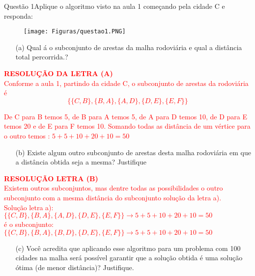\documentclass[12pt]{article}
\begin{document}
\begin{section}{Questão 1}{Aplique o algoritmo visto na aula 1 começando pela cidade C e responda:}

\begin{figure}[H]
    \centering
    \texttt{[image: Figuras/questao1.PNG]}
\end{figure}

\begin{itemize}
    \item[(a)] Qual á o subconjunto de arestas da malha rodoviária e qual a distância total percorrida.?
\end{itemize}

\noindent \textbf{\textcolor{red}{RESOLUÇÃO DA LETRA (A)}}\\

\noindent \textcolor{red}{Conforme a aula 1, partindo da cidade C, o subconjunto de arestas da rodoviária é $$\{\{C,B\},\{B,A\},\{A,D\},\{D,E\},\{E,F\}\}$$}

\noindent \textcolor{red}{De C para B temos 5, de B para A temos 5, de A para D temos 10, de D para E temos 20 e de E para F temos 10. Somando todas as distância de um vértice para o outro temos : $5 + 5 + 10 + 20 + 10 = 50$}

\begin{itemize}
    \item[(b)] Existe algum outro subconjunto de arestas desta malha rodoviária em que a distância obtida seja a mesma? Justifique
\end{itemize}

\noindent \textbf{\textcolor{red}{RESOLUÇÃO LETRA (B)}}\\

\noindent \textcolor{red}{Existem outros subconjuntos, mas dentre todas as possibilidades o outro subconjunto com a mesma distância do subconjunto solução da letra a).}\\

\noindent \textcolor{red}{Solução letra a): $\{\{C,B\},\{B,A\},\{A,D\},\{D,E\},\{E,F\}\} \rightarrow \boxed{5+5+10+20+10= 50}$}\\

\noindent \textcolor{red}{é o subconjunto:}\\

\noindent \textcolor{red}{$\{\{C,B\},\{B,A\},\{B,D\},\{D,E\},\{E,F\}\}
\rightarrow \boxed{5+5+10+20+10= 50}$ }\\


\begin{itemize}
    \item[(c)] Você acredita que aplicando esse algoritmo para um problema com 100 cidades na malha será possível garantir que a solução obtida é uma solução ótima (de menor distância)? Justifique.
\end{itemize}


\end{section}
\end{document}
